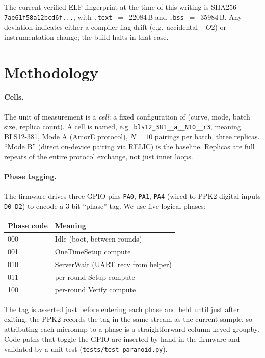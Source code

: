 \documentclass[11pt,a4paper]{article}
\begin{document}
The current verified ELF fingerprint at the time of this writing
is SHA256 \texttt{7ae61f58a12bcd6f...}, with \texttt{.text}~$=$~22084\,B
and \texttt{.bss}~$=$~35984\,B. Any deviation indicates either
a compiler-flag drift (e.g.\ accidental $-O2$) or instrumentation
change; the build halts in that case.



\section{Methodology}
\label{sec:method}

\paragraph{Cells.} The unit of measurement is a \emph{cell}:
a fixed configuration of (curve, mode, batch size, replica count).
A cell is named, e.g.\ \texttt{bls12\_381\_\_a\_\_N10\_\_r3},
meaning BLS12-381, Mode A (AmorE protocol), $N\!=\!10$ pairings
per batch, three replicas. ``Mode B'' (direct on-device pairing
via RELIC) is the baseline. Replicas are full repeats of the entire
protocol exchange, not just inner loops.

\paragraph{Phase tagging.} The firmware drives three GPIO pins
\texttt{PA0}, \texttt{PA1}, \texttt{PA4} (wired to PPK2 digital
inputs \texttt{D0--D2}) to encode a 3-bit ``phase'' tag. We use
five logical phases:
\begin{center}
\begin{tabular}{ll}
  \toprule
  Phase code & Meaning \\
  \midrule
  000 & Idle (boot, between rounds) \\
  001 & OneTimeSetup compute \\
  010 & ServerWait (UART recv from helper) \\
  011 & per-round Setup compute \\
  100 & per-round Verify compute \\
  \bottomrule
\end{tabular}
\end{center}

The tag is asserted just before entering each phase and held until
just after exiting; the PPK2 records the tag in the same stream as
the current sample, so attributing each microamp to a phase is a
straightforward column-keyed groupby. Code paths that toggle the
GPIO are inserted by hand in the firmware and validated by a unit
test (\texttt{tests/test\_paranoid.py}).
\end{document}
